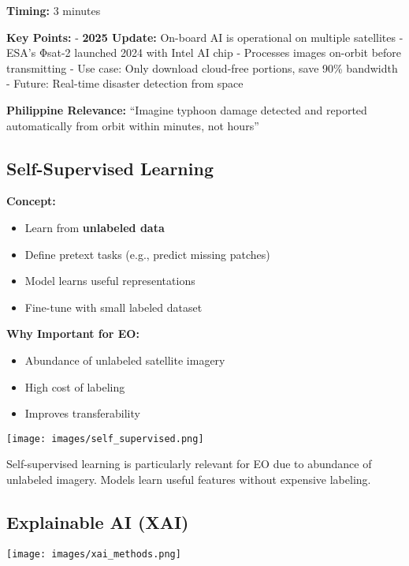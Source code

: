 \documentclass[
  letterpaper,
  DIV=11,
  numbers=noendperiod]{scrartcl}
\providecommand{\tightlist}{%
  \setlength{\itemsep}{0pt}\setlength{\parskip}{0pt}}
\begin{document}
\textbf{Timing:} 3 minutes

\textbf{Key Points:} - \textbf{2025 Update:} On-board AI is operational
on multiple satellites - ESA's Φsat-2 launched 2024 with Intel AI chip -
Processes images on-orbit before transmitting - Use case: Only download
cloud-free portions, save 90\% bandwidth - Future: Real-time disaster
detection from space

\textbf{Philippine Relevance:} ``Imagine typhoon damage detected and
reported automatically from orbit within minutes, not hours''

\subsection{Self-Supervised Learning}\label{self-supervised-learning}

\textbf{Concept:}

\begin{itemize}
\tightlist
\item
  Learn from \textbf{unlabeled data}
\item
  Define pretext tasks (e.g., predict missing patches)
\item
  Model learns useful representations
\item
  Fine-tune with small labeled dataset
\end{itemize}

\textbf{Why Important for EO:}

\begin{itemize}
\tightlist
\item
  Abundance of unlabeled satellite imagery
\item
  High cost of labeling
\item
  Improves transferability
\end{itemize}

\texttt{[image: images/self\_supervised.png]}

Self-supervised learning is particularly relevant for EO due to
abundance of unlabeled imagery. Models learn useful features without
expensive labeling.

\subsection{Explainable AI (XAI)}\label{explainable-ai-xai}

\begin{center}
\texttt{[image: images/xai\_methods.png]}
\end{center}
\end{document}
